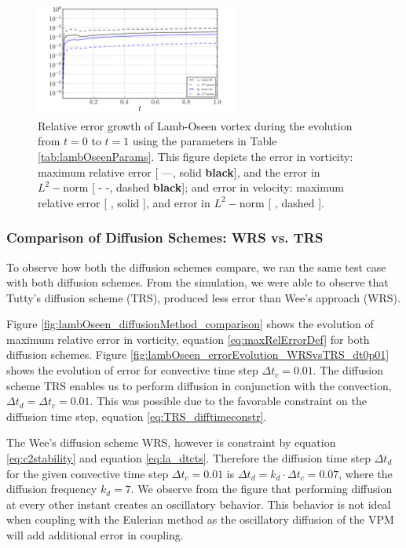 	\begin{figure}[!t]
	\centering
	\includegraphics[width=0.6\textwidth]{figures/lagrangian/lambOseen_errorEvolution_TRS_dt0p01.pdf}
	\caption{Relative error growth of Lamb-Oseen vortex during the evolution from $t=0$ to $t=1$ using the parameters in Table \ref{tab:lambOseenParams}. This figure depicts the error in vorticity: maximum relative error [ ---, solid \textbf{black}], and the error in $L^2-\mathrm{norm}$ [ - -, dashed \textbf{black}]; and error in velocity: maximum relative error [ {\color{plotBlue}{---}}, solid {}], and error in $L^2-\mathrm{norm}$ [ {\color{plotBlue}{- -}}, dashed {}].}
	\label{fig:lambOseen_convection_errorGrowth_compressed}
	\end{figure}
	
\subsubsection{Comparison of Diffusion Schemes: WRS vs. TRS}
\label{subsubsec:comp_wrs_trs}
To observe how both the diffusion schemes compare, we ran the same test case with both diffusion schemes. From the simulation, we were able to observe that Tutty's diffusion scheme (TRS), produced less error than Wee's approach (WRS). 

Figure \ref{fig:lambOseen_diffusionMethod_comparison} shows the evolution of maximum relative error in vorticity, equation \ref{eq:maxRelErrorDef} for both diffusion schemes. Figure \ref{fig:lambOseen_errorEvolution_WRSvsTRS_dt0p01} shows the evolution of error for convective time step $\Delta t_c = 0.01$. The diffusion scheme TRS enables us to perform diffusion in conjunction with the convection, $\Delta t_d = \Delta t_c = 0.01$. This was possible due to the favorable constraint on the diffusion time step, equation \ref{eq:TRS_difftimeconstr}.

The Wee's diffusion scheme WRS, however is constraint by equation \ref{eq:c2stability} and equation \ref{eq:la_dtcts}. Therefore the diffusion time step $\Delta t_d$ for the given convective time step $\Delta t_c = 0.01$ is $\Delta t_d = k_d \cdot \Delta t_c = 0.07$, where the diffusion frequency $k_d=7$. We observe from the figure that performing diffusion at every other instant creates an oscillatory behavior. This behavior is not ideal when coupling with the Eulerian method as the oscillatory diffusion of the VPM will add additional error in coupling.

